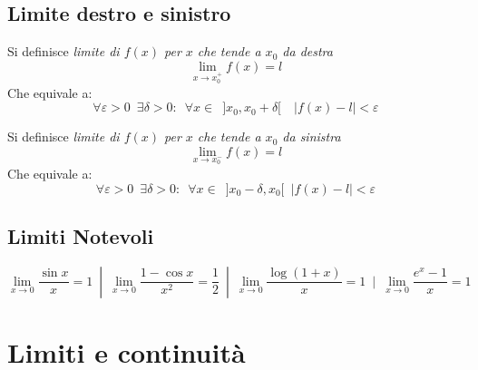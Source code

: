 \documentclass[10pt]{article}
\theoremstyle{plain}
\begin{document}
\subsection{Limite destro e sinistro}
\begin{defin}
Si definisce \textit{limite di $f(x)$ per $x$ che tende a $x_0$ da destra} 
\[\lim \limits_{x \rightarrow x_0^{+}} f(x) = l\]
Che equivale a:
\[\forall \varepsilon > 0 \enspace \exists \delta > 0 : \enspace \forall x \in \enspace ]x_0, x_0 + \delta[ \quad |f(x) - l| < \varepsilon\]
\end{defin}
\begin{defin}
Si definisce \textit{limite di $f(x)$ per $x$ che tende a $x_0$ da sinistra} 
\[\lim \limits_{x \rightarrow x_0^{-}} f(x) = l\]
Che equivale a:
\[\forall \varepsilon > 0 \enspace \exists \delta > 0 : \enspace \forall x \in \enspace ]x_0 - \delta, x_0[ \enspace |f(x) - l| < \varepsilon\]
\end{defin}

\subsection{Limiti Notevoli}

\[\lim \limits_{x \rightarrow 0} \frac{\sin x}{x} = 1 \enspace | \enspace \lim \limits_{x \rightarrow 0} \frac{1 - \cos x}{x^2} = \frac{1}{2} \enspace | \enspace \lim \limits_{x \rightarrow 0} \frac{\log (1+x)}{x} = 1 \enspace | \enspace \lim \limits_{x \rightarrow 0} \frac{e^x - 1}{x} = 1\]


\section{Limiti e continuità}
\end{document}
